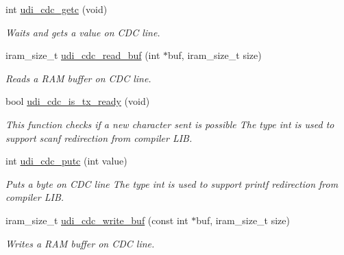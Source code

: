 \begin{DoxyCompactItemize}
int \hyperlink{group__udi__cdc__group_ga202f3fd7b153f6e1a41601735e0febb6}{udi\-\_\-cdc\-\_\-getc} (void)
\begin{DoxyCompactList}\small\item\em \-Waits and gets a value on \-C\-D\-C line. \end{DoxyCompactList}\item 
iram\-\_\-size\-\_\-t \hyperlink{group__udi__cdc__group_gaa7374616de8bc3a83de3f1884b56fa39}{udi\-\_\-cdc\-\_\-read\-\_\-buf} (int $\ast$buf, iram\-\_\-size\-\_\-t size)
\begin{DoxyCompactList}\small\item\em \-Reads a \-R\-A\-M buffer on \-C\-D\-C line. \end{DoxyCompactList}\item 
bool \hyperlink{group__udi__cdc__group_ga7d0d458a5731da95dd05f30714c42dde}{udi\-\_\-cdc\-\_\-is\-\_\-tx\-\_\-ready} (void)
\begin{DoxyCompactList}\small\item\em \-This function checks if a new character sent is possible \-The type int is used to support scanf redirection from compiler \-L\-I\-B. \end{DoxyCompactList}\item 
int \hyperlink{group__udi__cdc__group_ga8faae3fcf4911017c0fcf0aa127179f6}{udi\-\_\-cdc\-\_\-putc} (int value)
\begin{DoxyCompactList}\small\item\em \-Puts a byte on \-C\-D\-C line \-The type int is used to support printf redirection from compiler \-L\-I\-B. \end{DoxyCompactList}\item 
iram\-\_\-size\-\_\-t \hyperlink{group__udi__cdc__group_ga88f09b3f954620d37bf882e6d1874c42}{udi\-\_\-cdc\-\_\-write\-\_\-buf} (const int $\ast$buf, iram\-\_\-size\-\_\-t size)
\begin{DoxyCompactList}\small\item\em \-Writes a \-R\-A\-M buffer on \-C\-D\-C line. \end{DoxyCompactList}\end{DoxyCompactItemize}



